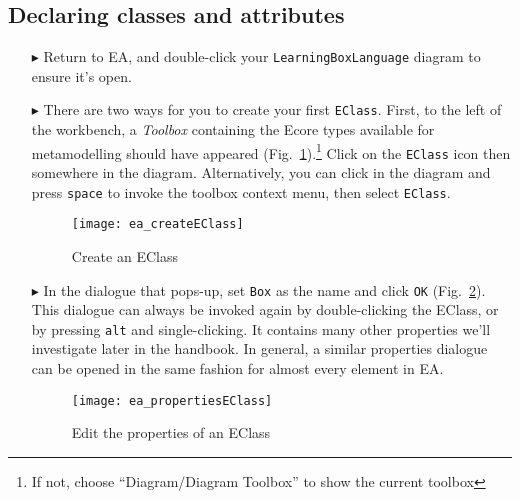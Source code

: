 \newpage
\subsection{Declaring classes and attributes}
\visHeader
\hypertarget{static:classes vis}{}

\begin{itemize}

\item[$\blacktriangleright$] Return to EA, and double-click your \texttt{LearningBoxLanguage} diagram to ensure it's open.

\vspace{0.5cm}

\item[$\blacktriangleright$] There are two ways for you to create your first \texttt{EClass}. First, to the left of the workbench, a \emph{Toolbox} containing
the Ecore types available for metamodelling should have appeared (Fig.~\ref{fig:eclass}).\footnote{If not, choose ``Diagram/Diagram Toolbox'' to show the
current toolbox} Click on the \texttt{EClass} icon then somewhere in the diagram. Alternatively, you can click in the diagram and press \texttt{space} to invoke
the toolbox context menu, then select \texttt{EClass}.

\vspace{0.5cm}

\begin{figure}[htbp]
	\centering
  \texttt{[image: ea\_createEClass]}
	\caption{Create an EClass}
	\label{fig:eclass}
\end{figure}

\vspace{0.5cm}

\item[$\blacktriangleright$] In the dialogue that pops-up, set \texttt{Box} as the name and click \texttt{OK} (Fig.~\ref{fig:eclass_properties}).
This dialogue can always be invoked again by double-clicking the EClass, or by pressing \texttt{alt} and single-clicking. It contains many other properties
we'll investigate later in the handbook. In general, a similar properties dialogue can be opened in the same fashion for almost every element in EA.

\clearpage

\begin{figure}[ht]
	\centering
  \texttt{[image: ea\_propertiesEClass]}
	\caption{Edit the properties of an EClass}
	\label{fig:eclass_properties}
\end{figure}


\end{itemize}
